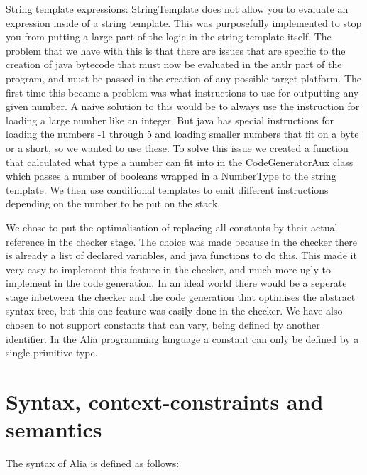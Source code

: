 \documentclass[paper=a4, fontsize=11pt]{article}
\numberwithin{equation}{section}		%
\numberwithin{figure}{section}			%
\numberwithin{table}{section}				%
\begin{document}
String template expressions: StringTemplate does not allow you to evaluate an expression inside of a string template. This was purposefully implemented to stop you from putting a large part of the logic in the string template itself. The problem that we have with this is that there are issues that are specific to the creation of java bytecode that must now be evaluated in the antlr part of the program, and must be passed in the creation of any possible target platform. The first time this became a problem was what instructions to use for outputting any given number. A naive solution to this would be to always use the instruction for loading a large number like an integer. But java has special instructions for loading the numbers -1 through 5 and loading smaller numbers that fit on a byte or a short, so we wanted to use these. To solve this issue we created a function that calculated what type a number can fit into in the CodeGeneratorAux class which passes a number of booleans wrapped in a NumberType to the string template. We then use conditional templates to emit different instructions depending on the number to be put on the stack.


We chose to put the optimalisation of replacing all constants by their actual reference in the checker stage. The choice was made because in the checker there is already a list of declared variables, and java functions to do this. This made it very easy to implement this feature in the checker, and much more ugly to implement in the code generation. In an ideal world there would be a seperate stage inbetween the checker and the code generation that optimises the abstract syntax tree, but this one feature was easily done in the checker. We have also chosen to not support constants that can vary, being defined by another identifier. In the Alia programming language a constant can only be defined by a single primitive type.



\section{Syntax, context-constraints and semantics}
The syntax of Alia is defined as follows:
\end{document}
